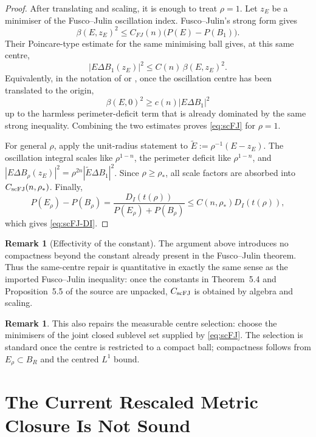 \documentclass[11pt]{article}
\theoremstyle{definition}
\newtheorem{remark}[theorem]{Remark}
\newcommand{\rstar}{\rho_*}
\begin{document}
\begin{proof}
After translating and scaling, it is enough to treat \(\rho=1\).  Let \(z_E\)
be a minimiser of the Fusco--Julin oscillation index.  Fusco--Julin's strong
form gives
\[
   \beta(E,z_E)^2\le C_{FJ}(n)\bigl(P(E)-P(B_1)\bigr).
\]
Their Poincare-type estimate for the same minimising ball gives, at this
same centre,
\[
   |E\Delta B_1(z_E)|^2
   \le C(n)\,\beta(E,z_E)^2 .
\]
Equivalently, in the notation of \cite[Prop.~1.2]{FJ2014} or
\cite[Prop.~5.5]{FuscoSurvey2015}, once the oscillation centre has been
translated to the origin,
\[
   \beta(E,0)^2\ge c(n)|E\Delta B_1|^2
\]
up to the harmless perimeter-deficit term that is already dominated by the
same strong inequality.  Combining the two estimates proves
\eqref{eq:scFJ} for \(\rho=1\).

For general \(\rho\), apply the unit-radius statement to
\(\widetilde E:=\rho^{-1}(E-z_E)\).  The oscillation integral scales like
\(\rho^{1-n}\), the perimeter deficit like \(\rho^{1-n}\), and
\(|E\Delta B_\rho(z_E)|^2=\rho^{2n}|\widetilde E\Delta B_1|^2\).  Since
\(\rho\ge\rstar\), all scale factors are absorbed into
\(C_{\rm scFJ}(n,\rstar)\).  Finally,
\[
   P(E_\rho)-P(B_\rho)
   =
   \frac{D_I(t(\rho))}{P(E_\rho)+P(B_\rho)}
   \le C(n,\rstar)D_I(t(\rho)),
\]
which gives \eqref{eq:scFJ-DI}.
\end{proof}

\begin{remark}[Effectivity of the constant]
The argument above introduces no compactness beyond the constant already
present in the Fusco--Julin theorem.  Thus the same-centre repair is
quantitative in exactly the same sense as the imported Fusco--Julin
inequality: once the constants in Theorem~5.4 and Proposition~5.5 of the
source are unpacked, \(C_{\rm scFJ}\) is obtained by algebra and scaling.
\end{remark}

\begin{remark}
This also repairs the measurable centre selection: choose the minimisers of
the joint closed sublevel set supplied by \eqref{eq:scFJ}.  The selection is
standard once the centre is restricted to a compact ball; compactness follows
from \(E_\rho\subset B_R\) and the centred \(L^1\) bound.
\end{remark}

\section{The Current Rescaled Metric Closure Is Not Sound}
\end{document}

